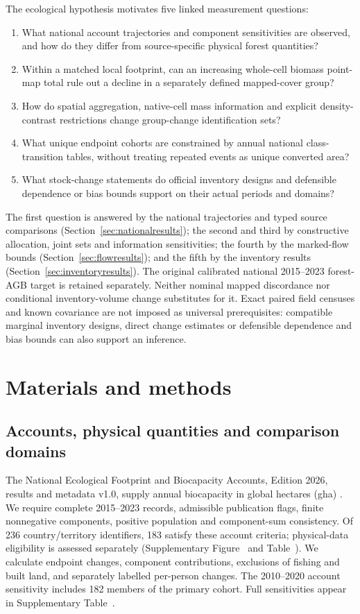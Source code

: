 \documentclass[11pt,a4paper]{article}
\begin{document}
The ecological hypothesis motivates five linked measurement questions:
\begin{enumerate}
\item What national account trajectories and component sensitivities are observed, and how do they differ from source-specific physical forest quantities?
\item Within a matched local footprint, can an increasing whole-cell biomass point-map total rule out a decline in a separately defined mapped-cover group?
\item How do spatial aggregation, native-cell mass information and explicit density-contrast restrictions change group-change identification sets?
\item What unique endpoint cohorts are constrained by annual national class-transition tables, without treating repeated events as unique converted area?
\item What stock-change statements do official inventory designs and defensible dependence or bias bounds support on their actual periods and domains?
\end{enumerate}
The first question is answered by the national trajectories and typed source comparisons (Section~\ref{sec:nationalresults}); the second and third by constructive allocation, joint sets and information sensitivities; the fourth by the marked-flow bounds (Section~\ref{sec:flowresults}); and the fifth by the inventory results (Section~\ref{sec:inventoryresults}). The original calibrated national 2015--2023 forest-AGB target is retained separately. Neither nominal mapped discordance nor conditional inventory-volume change substitutes for it. Exact paired field censuses and known covariance are not imposed as universal prerequisites: compatible marginal inventory designs, direct change estimates or defensible dependence and bias bounds can also support an inference.

\section{Materials and methods}
\subsection{Accounts, physical quantities and comparison domains}
The National Ecological Footprint and Biocapacity Accounts, Edition 2026, results and metadata v1.0, supply annual biocapacity in global hectares (gha) \citep{Lo2026}. We require complete 2015--2023 records, admissible publication flags, finite nonnegative components, positive population and component-sum consistency. Of 236 country/territory identifiers, 183 satisfy these account criteria; physical-data eligibility is assessed separately (Supplementary Figure~ and Table~). We calculate endpoint changes, component contributions, exclusions of fishing and built land, and separately labelled per-person changes. The 2010--2020 account sensitivity includes 182 members of the primary cohort. Full sensitivities appear in Supplementary Table~.
\end{document}
